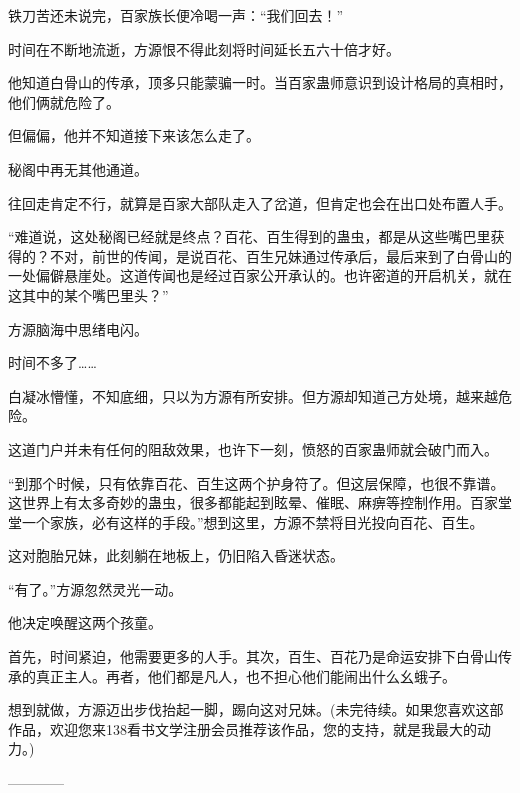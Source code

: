 \begin{this_body}
铁刀苦还未说完，百家族长便冷喝一声：“我们回去！”

时间在不断地流逝，方源恨不得此刻将时间延长五六十倍才好。

他知道白骨山的传承，顶多只能蒙骗一时。当百家蛊师意识到设计格局的真相时，他们俩就危险了。

但偏偏，他并不知道接下来该怎么走了。

秘阁中再无其他通道。

往回走肯定不行，就算是百家大部队走入了岔道，但肯定也会在出口处布置人手。

“难道说，这处秘阁已经就是终点？百花、百生得到的蛊虫，都是从这些嘴巴里获得的？不对，前世的传闻，是说百花、百生兄妹通过传承后，最后来到了白骨山的一处偏僻悬崖处。这道传闻也是经过百家公开承认的。也许密道的开启机关，就在这其中的某个嘴巴里头？”

方源脑海中思绪电闪。

时间不多了……

白凝冰懵懂，不知底细，只以为方源有所安排。但方源却知道己方处境，越来越危险。

这道门户并未有任何的阻敌效果，也许下一刻，愤怒的百家蛊师就会破门而入。

“到那个时候，只有依靠百花、百生这两个护身符了。但这层保障，也很不靠谱。这世界上有太多奇妙的蛊虫，很多都能起到眩晕、催眠、麻痹等控制作用。百家堂堂一个家族，必有这样的手段。”想到这里，方源不禁将目光投向百花、百生。

这对胞胎兄妹，此刻躺在地板上，仍旧陷入昏迷状态。

“有了。”方源忽然灵光一动。

他决定唤醒这两个孩童。

首先，时间紧迫，他需要更多的人手。其次，百生、百花乃是命运安排下白骨山传承的真正主人。再者，他们都是凡人，也不担心他们能闹出什么幺蛾子。

想到就做，方源迈出步伐抬起一脚，踢向这对兄妹。(未完待续。如果您喜欢这部作品，欢迎您来138看书文学注册会员推荐该作品，您的支持，就是我最大的动力。)

------------

\end{this_body}

